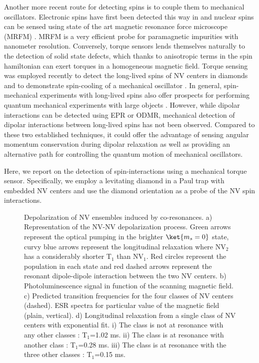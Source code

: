 \documentclass[preprintnumbers,amsmath,amssymb,superscriptaddress,twocolumn,showpacs]{revtex4-1}
\begin{document}
Another more recent route for detecting spins is to couple them to mechanical oscillators.
Electronic spins have first been detected this way in \cite{Alzetta} and nuclear spins can be sensed using state of the art magnetic resonance force microscope (MRFM) \cite{rugar, MaminH}. MRFM is a very efficient probe for paramagnetic impurities with nanometer resolution.
Conversely, torque sensors lends themselves naturally to the detection of solid state defects, which thanks to anisotropic terms in the spin hamiltonian can exert torques in a homogeneous magnetic field. 
Torque sensing was employed recently to detect the long-lived spins of NV centers in diamonds and to demonstrate spin-cooling of a mechanical oscillator \cite{DelordNat}.
In general, spin-mechanical experiments with long-lived spins also offer prospects for performing quantum mechanical experiments with large objects \cite{yin, Wan, Scala, Lee_2017}. However, while dipolar interactions can be detected using EPR or ODMR, mechanical detection of dipolar interactions between long-lived spins has not been observed. Compared to these two established techniques, it could offer the advantage of sensing angular momentum conservation during dipolar relaxation \cite{Zangara} as well as providing an alternative path for controlling the quantum motion of mechanical oscillators.

Here, we report on the detection of spin-interactions using a mechanical torque sensor.
Specifically, we employ a levitating diamond in a Paul trap with embedded NV centers and use the diamond orientation as a probe of the NV spin interactions.


\begin{figure*}[!ht]
  \centering {}
  \caption{Depolarization of NV ensembles induced by co-resonances. a) Representation of the NV-NV depolarization process. Green arrows represent the optical pumping in the brighter $\ket{m_s=0}$ state, curvy blue arrows represent the longitudinal relaxation where NV$_2$ has a considerably shorter T$_1$ than NV$_1$. Red circles represent the population in each state and red dashed arrows represent the resonant dipole-dipole interaction between the two NV centers. b) Photoluminescence signal in function of the scanning magnetic field. c) Predicted transition frequencies for the four classes of NV centers (dashed). ESR spectra for particular value of the magnetic field (plain, vertical). d) Longitudinal relaxation from a single class of NV centers with exponential fit. i) The class is not at resonance with any other classes : T$_1$=1.02 ms. ii) The class is at resonance with another class : T$_1$=0.28 ms. iii) The class is at resonance with the three other classes : T$_1$=0.15 ms.}
  \label{CR_deposited}
\end{figure*}
\end{document}
